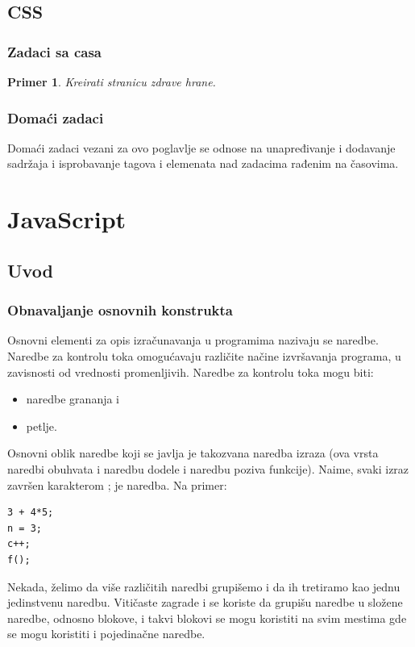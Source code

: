 \documentclass[a4paper]{article}
\newtheorem{primer}{Primer}[section]
\begin{document}
\subsection{CSS}
\subsubsection{Zadaci sa casa}

\begin{primer}
Kreirati stranicu zdrave hrane.
\end{primer}

\subsubsection{Domaći zadaci}
Domaći zadaci vezani za ovo poglavlje se odnose na unapređivanje i dodavanje sadržaja i isprobavanje tagova i elemenata nad zadacima rađenim na časovima. 

\newpage

\section{JavaScript}
\label{sec:javascript}

\subsection{Uvod}
\subsubsection{Obnavaljanje osnovnih konstrukta}
Osnovni elementi za opis izračunavanja u programima nazivaju se naredbe.
Naredbe za kontrolu toka omogućavaju različite načine izvršavanja programa, u zavisnosti od vrednosti promenljivih. Naredbe za kontrolu toka mogu biti:
\begin{itemize}
\item naredbe grananja i 
\item petlje.
\end{itemize}
Osnovni oblik naredbe koji se javlja je takozvana naredba izraza (ova vrsta naredbi obuhvata i naredbu dodele i naredbu poziva funkcije).
Naime, svaki izraz završen karakterom ; je naredba. Na primer:
\begin{verbatim}
3 + 4*5;
n = 3;
c++;
f();	
\end{verbatim}
Nekada, želimo da više različitih naredbi grupišemo i da ih tretiramo kao jednu jedinstvenu naredbu. Vitičaste zagrade { i } se koriste da grupišu naredbe u složene naredbe, odnosno blokove, i takvi blokovi se mogu koristiti na svim mestima gde se mogu koristiti i pojedinačne naredbe. 
\end{document}

